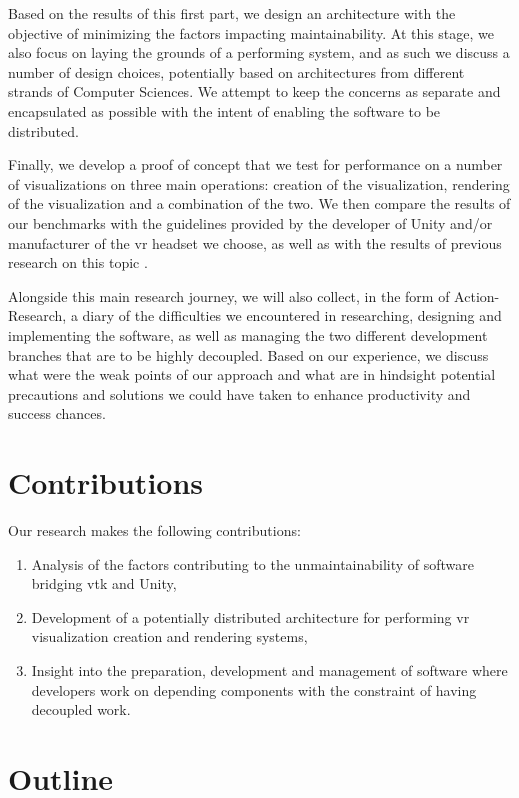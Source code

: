 Based on the results of this first part, we design an architecture with the objective of minimizing the factors impacting maintainability. At this stage, we also focus on laying the grounds of a performing system, and as such we discuss a number of design choices, potentially based on architectures from different strands of Computer Sciences. We attempt to keep the concerns as separate and encapsulated as possible with the intent of enabling the software to be distributed.

Finally, we develop a proof of concept that we test for performance on a number of visualizations on three main operations: creation of the visualization, rendering of the visualization and a combination of the two. We then compare the results of our benchmarks with the guidelines provided by the developer of Unity and/or manufacturer of the \acrshort{vr} headset we choose, as well as with the results of previous research on this topic \cite{dreuning_visual_2016, wheeler_virtual_2018}.

Alongside this main research journey, we will also collect, in the form of Action-Research, a diary of the difficulties we encountered in researching, designing and implementing the software, as well as managing the two different development branches that are to be highly decoupled. Based on our experience, we discuss what were the weak points of our approach and what are in hindsight potential precautions and solutions we could have taken to enhance productivity and success chances.

\section{Contributions}

Our research makes the following contributions:

\begin{enumerate}
	\item Analysis of the factors contributing to the unmaintainability of software bridging \acrshort{vtk} and Unity,
	\item Development of a potentially distributed architecture for performing \acrshort{vr} visualization creation and rendering systems,
	\item Insight into the preparation, development and management of software where developers work on depending components with the constraint of having decoupled work.
\end{enumerate}

\section{Outline}

